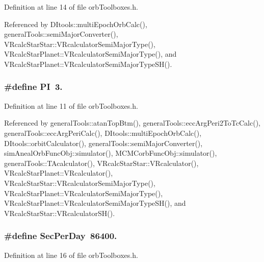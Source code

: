 Definition at line 14 of file orb\-Toolboxes.\-h.



Referenced by D\-Itools\-::multi\-Epoch\-Orb\-Calc(), general\-Tools\-::semi\-Major\-Converter(), V\-Rcalc\-Star\-Star\-::\-V\-Rcalculator\-Semi\-Major\-Type(), V\-Rcalc\-Star\-Planet\-::\-V\-Rcalculator\-Semi\-Major\-Type(), and V\-Rcalc\-Star\-Planet\-::\-V\-Rcalculator\-Semi\-Major\-Type\-S\-H().

\subsubsection[{P\-I}]{\setlength{\rightskip}{0pt plus 5cm}\#define P\-I~3.}\label{orb_toolboxes_8h_a598a3330b3c21701223ee0ca14316eca}


Definition at line 11 of file orb\-Toolboxes.\-h.



Referenced by general\-Tools\-::atan\-Top\-Btm(), general\-Tools\-::ecc\-Arg\-Peri2\-To\-Tc\-Calc(), general\-Tools\-::ecc\-Arg\-Peri\-Calc(), D\-Itools\-::multi\-Epoch\-Orb\-Calc(), D\-Itools\-::orbit\-Calculator(), general\-Tools\-::semi\-Major\-Converter(), sim\-Aneal\-Orb\-Func\-Obj\-::simulator(), M\-C\-M\-Corb\-Func\-Obj\-::simulator(), general\-Tools\-::\-T\-Acalculator(), V\-Rcalc\-Star\-Star\-::\-V\-Rcalculator(), V\-Rcalc\-Star\-Planet\-::\-V\-Rcalculator(), V\-Rcalc\-Star\-Star\-::\-V\-Rcalculator\-Semi\-Major\-Type(), V\-Rcalc\-Star\-Planet\-::\-V\-Rcalculator\-Semi\-Major\-Type(), V\-Rcalc\-Star\-Planet\-::\-V\-Rcalculator\-Semi\-Major\-Type\-S\-H(), and V\-Rcalc\-Star\-Star\-::\-V\-Rcalculator\-S\-H().

\subsubsection[{Sec\-Per\-Day}]{\setlength{\rightskip}{0pt plus 5cm}\#define Sec\-Per\-Day~86400.}\label{orb_toolboxes_8h_a7418946957d43f7beeb2ba6055489d8b}


Definition at line 16 of file orb\-Toolboxes.\-h.


